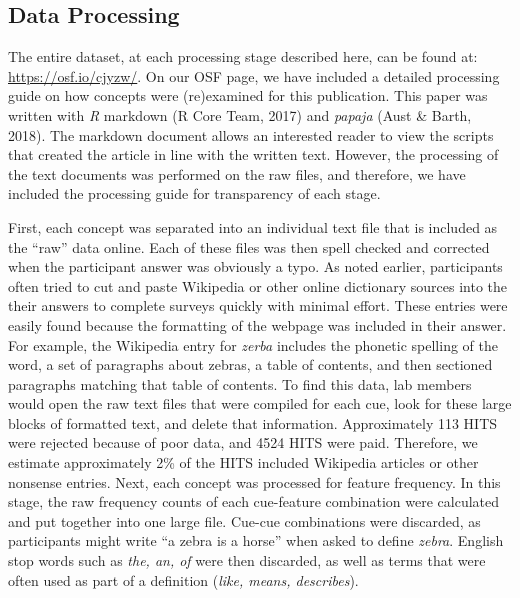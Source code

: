 \documentclass[english,,man]{apa6}
\theoremstyle{definition}
\theoremstyle{definition}
\theoremstyle{definition}
\theoremstyle{remark}
\begin{document}
\hypertarget{data-processing}{%
\subsection{Data Processing}\label{data-processing}}

The entire dataset, at each processing stage described here, can be
found at: \url{https://osf.io/cjyzw/}. On our OSF page, we have included
a detailed processing guide on how concepts were (re)examined for this
publication. This paper was written with \emph{R} markdown (R Core Team,
2017) and \emph{papaja} (Aust \& Barth, 2018). The markdown document
allows an interested reader to view the scripts that created the article
in line with the written text. However, the processing of the text
documents was performed on the raw files, and therefore, we have
included the processing guide for transparency of each stage.

First, each concept was separated into an individual text file that is
included as the \enquote{raw} data online. Each of these files was then
spell checked and corrected when the participant answer was obviously a
typo. As noted earlier, participants often tried to cut and paste
Wikipedia or other online dictionary sources into the their answers to
complete surveys quickly with minimal effort. These entries were easily
found because the formatting of the webpage was included in their
answer. For example, the Wikipedia entry for \emph{zerba} includes the
phonetic spelling of the word, a set of paragraphs about zebras, a table
of contents, and then sectioned paragraphs matching that table of
contents. To find this data, lab members would open the raw text files
that were compiled for each cue, look for these large blocks of
formatted text, and delete that information. Approximately 113 HITS were
rejected because of poor data, and 4524 HITS were paid. Therefore, we
estimate approximately 2\% of the HITS included Wikipedia articles or
other nonsense entries. Next, each concept was processed for feature
frequency. In this stage, the raw frequency counts of each cue-feature
combination were calculated and put together into one large file.
Cue-cue combinations were discarded, as participants might write
\enquote{a zebra is a horse} when asked to define \emph{zebra}. English
stop words such as \emph{the, an, of} were then discarded, as well as
terms that were often used as part of a definition (\emph{like, means,
describes}).
\end{document}
